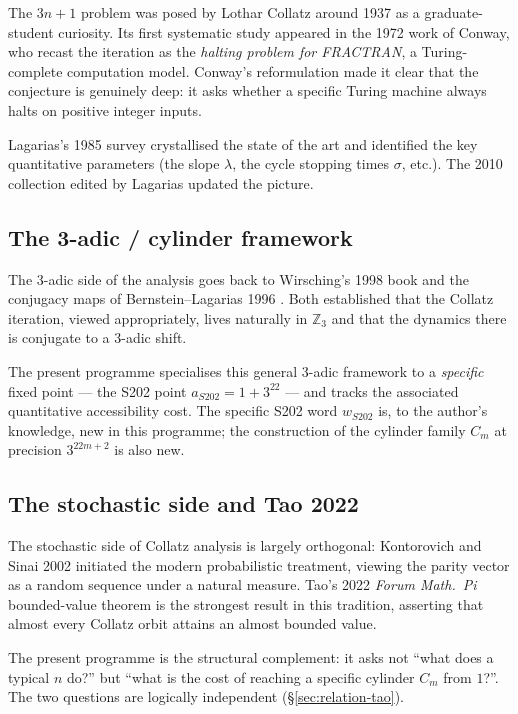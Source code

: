 \documentclass[11pt,a4paper]{article}
\theoremstyle{plain}
\theoremstyle{definition}
\newcommand{\Zp}[1]{\mathbb{Z}_{#1}}
\newcommand{\aS}{a_{S202}}
\newcommand{\wS}{w_{S202}}
\begin{document}
The $3n + 1$ problem was posed by Lothar Collatz around 1937 as a
graduate-student curiosity. Its first systematic study appeared in
the 1972 work of Conway, who recast the iteration as the
\emph{halting problem for FRACTRAN}, a Turing-complete computation
model. Conway's reformulation made it clear that the conjecture
is genuinely deep: it asks whether a specific Turing machine
always halts on positive integer inputs.

Lagarias's 1985 survey
\cite[ref.~1]{app:references}
crystallised the state of the art and identified the key
quantitative parameters (the slope $\lambda$, the cycle stopping
times $\sigma$, etc.). The 2010 collection edited by Lagarias
\cite[ref.~2]{app:references} updated the picture.

\subsection{The 3-adic / cylinder framework}

The 3-adic side of the analysis goes back to Wirsching's 1998
book \cite[ref.~3]{app:references} and the conjugacy
maps of Bernstein--Lagarias 1996
\cite[ref.~7]{app:references}. Both established that the Collatz
iteration, viewed appropriately, lives naturally in
$\Zp{3}$ and that the dynamics there is conjugate to a 3-adic shift.

The present programme specialises this general 3-adic
framework to a \emph{specific} fixed point — the S202 point
$\aS = 1 + 3^{22}$ — and tracks the associated quantitative
accessibility cost. The specific S202 word $\wS$ is, to the
author's knowledge, new in this programme; the construction of
the cylinder family $C_m$ at precision $3^{22m + 2}$ is also new.

\subsection{The stochastic side and Tao 2022}

The stochastic side of Collatz analysis is largely orthogonal:
Kontorovich and Sinai 2002
\cite[ref.~5]{app:references} initiated the modern probabilistic
treatment, viewing the parity vector as a random sequence under a
natural measure. Tao's 2022 \emph{Forum Math.\ Pi} bounded-value
theorem is the strongest result in this tradition, asserting that
almost every Collatz orbit attains an almost bounded value.

The present programme is the structural complement: it asks not
``what does a typical $n$ do?'' but ``what is the cost of reaching
a specific cylinder $C_m$ from $1$?''. The two questions are
logically independent (\S\ref{sec:relation-tao}).
\end{document}

